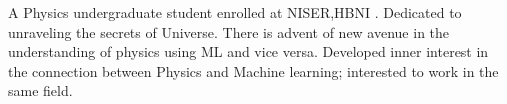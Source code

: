 

\begin{cvparagraph}

A Physics undergraduate student enrolled at NISER,HBNI . Dedicated to unraveling the secrets of Universe. There is advent of new avenue in the understanding of physics using ML and vice versa. Developed inner interest in the connection between Physics and Machine learning; interested to work in the same field.
\end{cvparagraph}